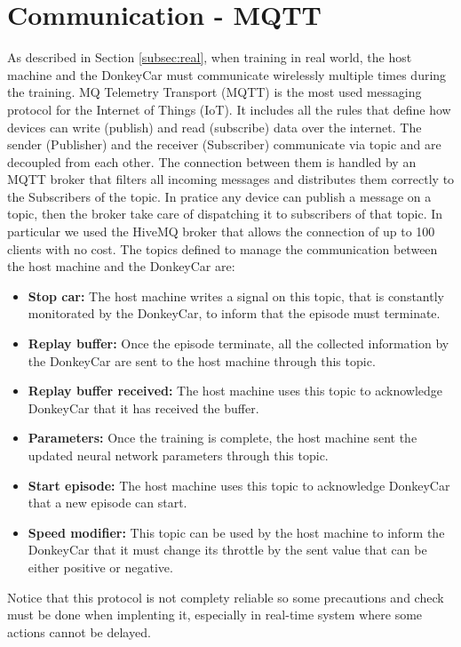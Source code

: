 \section{Communication - MQTT}

As described in Section \ref{subsec:real}, when training in real world, the host machine and the DonkeyCar must communicate wirelessly multiple times during the training. MQ Telemetry Transport (MQTT) is the most used messaging protocol for the Internet of Things (IoT). It includes all the rules that define how devices can write (publish) and read (subscribe) data over the internet. The sender (Publisher) and the receiver (Subscriber) communicate via topic and are decoupled from each other. The connection between them is handled by an MQTT broker that filters all incoming messages and distributes them correctly to the Subscribers of the topic. In pratice any device can publish a message on a topic, then the broker take care of dispatching it to subscribers of that topic. In particular we used the HiveMQ broker that allows the connection of up to 100 clients with no cost. The topics defined to manage the communication between the host machine and the DonkeyCar are:

\begin{itemize}
    \item \textbf{Stop car:} The host machine writes a signal on this topic, that is constantly monitorated by the DonkeyCar, to inform that the episode must terminate.
    \item \textbf{Replay buffer:} Once the episode terminate, all the collected information by the DonkeyCar are sent to the host machine through this topic.
    \item \textbf{Replay buffer received:} The host machine uses this topic to acknowledge DonkeyCar that it has received the buffer.
    \item \textbf{Parameters:} Once the training is complete, the host machine sent the updated neural network parameters through this topic.
    \item \textbf{Start episode:} The host machine uses this topic to acknowledge DonkeyCar that a new episode can start.
    \item \textbf{Speed modifier:} This topic can be used by the host machine to inform the DonkeyCar that it must change its throttle by the sent value that can be either positive or negative.
\end{itemize}

Notice that this protocol is not complety reliable so some precautions and check must be done when implenting it, especially in real-time system where some actions cannot be delayed.

